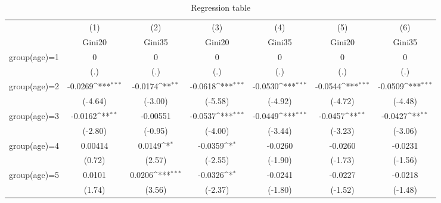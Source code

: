 \begin{table}[htbp]\centering
\def\sym#1{\ifmmode^{#1}\else\(^{#1}\)\fi}
\caption{Regression table\label{reg3}}
\begin{tabular}{l*{6}{c}}
\hline\hline
                    &\multicolumn{1}{c}{(1)}&\multicolumn{1}{c}{(2)}&\multicolumn{1}{c}{(3)}&\multicolumn{1}{c}{(4)}&\multicolumn{1}{c}{(5)}&\multicolumn{1}{c}{(6)}\\
                    &\multicolumn{1}{c}{Gini20}&\multicolumn{1}{c}{Gini35}&\multicolumn{1}{c}{Gini20}&\multicolumn{1}{c}{Gini35}&\multicolumn{1}{c}{Gini20}&\multicolumn{1}{c}{Gini35}\\
\hline
group(age)=1        &           0         &           0         &           0         &           0         &           0         &           0         \\
                    &         (.)         &         (.)         &         (.)         &         (.)         &         (.)         &         (.)         \\
[1em]
group(age)=2        &     -0.0269\sym{***}&     -0.0174\sym{**} &     -0.0618\sym{***}&     -0.0530\sym{***}&     -0.0544\sym{***}&     -0.0509\sym{***}\\
                    &     (-4.64)         &     (-3.00)         &     (-5.58)         &     (-4.92)         &     (-4.72)         &     (-4.48)         \\
[1em]
group(age)=3        &     -0.0162\sym{**} &    -0.00551         &     -0.0537\sym{***}&     -0.0449\sym{***}&     -0.0457\sym{**} &     -0.0427\sym{**} \\
                    &     (-2.80)         &     (-0.95)         &     (-4.00)         &     (-3.44)         &     (-3.23)         &     (-3.06)         \\
[1em]
group(age)=4        &     0.00414         &      0.0149\sym{*}  &     -0.0359\sym{*}  &     -0.0260         &     -0.0260         &     -0.0231         \\
                    &      (0.72)         &      (2.57)         &     (-2.55)         &     (-1.90)         &     (-1.73)         &     (-1.56)         \\
[1em]
group(age)=5        &      0.0101         &      0.0206\sym{***}&     -0.0326\sym{*}  &     -0.0241         &     -0.0227         &     -0.0218         \\
                    &      (1.74)         &      (3.56)         &     (-2.37)         &     (-1.80)         &     (-1.52)         &     (-1.48)         \\

\end{tabular}
\end{table}
